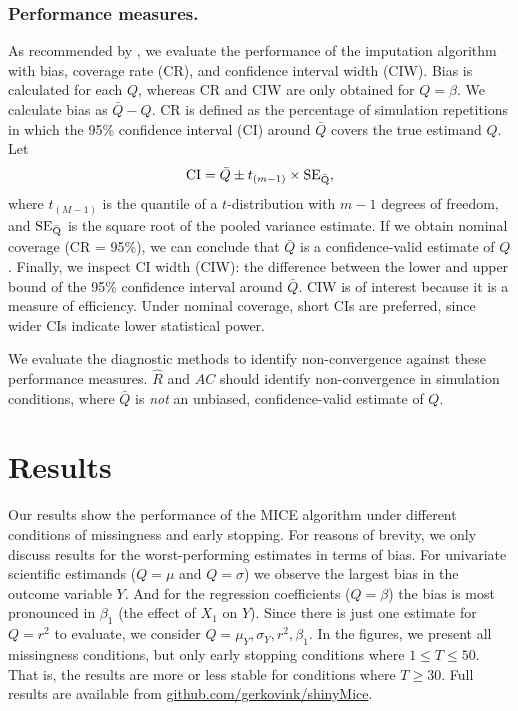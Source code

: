 \documentclass[Royal,times,sageh]{sagej}
\begin{document}
\hypertarget{performance-measures.}{%
\subsubsection{Performance measures.}\label{performance-measures.}}

As recommended by \citet{buur18}, we evaluate the performance of the imputation algorithm with bias, coverage rate (CR), and confidence interval width (CIW). Bias is calculated for each \(Q\), whereas CR and CIW are only obtained for \(Q = \beta\). We calculate bias as \(\bar{Q} - Q\). CR is defined as the percentage of simulation repetitions in which the 95\% confidence interval (CI) around \(\bar{Q}\) covers the true estimand \(Q\). Let
\[\text{CI} = \bar{Q} \pm t_{(m-1)} \times \rm SE_{\bar{Q}},\]
where \(t_{(M-1)}\) is the quantile of a \(t\)-distribution with \(m-1\) degrees of freedom, and \(\rm SE_{\bar{Q}}\) is the square root of the pooled variance estimate. If we obtain nominal coverage (CR = 95\%), we can conclude that \(\bar{Q}\) is a confidence-valid estimate of \(Q\). Finally, we inspect CI width (CIW): the difference between the lower and upper bound of the 95\% confidence interval around \(\bar{Q}\). CIW is of interest because it is a measure of efficiency. Under nominal coverage, short CIs are preferred, since wider CIs indicate lower statistical power.

We evaluate the diagnostic methods to identify non-convergence against these performance measures. \(\widehat{R}\) and \(AC\) should identify non-convergence in simulation conditions, where \(\bar{Q}\) is \emph{not} an unbiased, confidence-valid estimate of \(Q\).

\hypertarget{results}{%
\section{Results}\label{results}}

Our results show the performance of the MICE algorithm under different conditions of missingness and early stopping. For reasons of brevity, we only discuss results for the worst-performing estimates in terms of bias. For univariate scientific estimands (\(Q=\mu\) and \(Q=\sigma\)) we observe the largest bias in the outcome variable \(Y\). And for the regression coefficients (\(Q=\beta\)) the bias is most pronounced in \(\beta_1\) (the effect of \(X_1\) on \(Y\)). Since there is just one estimate for \(Q=r^2\) to evaluate, we consider \(Q=\mu_Y, \sigma_Y,r^2, \beta_1\). In the figures, we present all missingness conditions, but only early stopping conditions where \(1 \leq T\leq50\). That is, the results are more or less stable for conditions where \(T \geq 30\). Full results are available from \href{https://github.com/gerkovink/shinyMice/tree/master/3.Thesis/}{github.com/gerkovink/shinyMice}.
\end{document}
